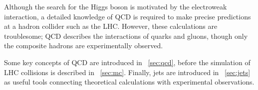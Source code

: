 
Although the search for the Higgs boson is motivated by the electroweak interaction, a
detailed knowledge of \ac{QCD} is required to make precise predictions at a hadron 
collider such as the LHC. However, these calculations are troublesome; \ac{QCD} 
describes the interactions of quarks and gluons, though only the composite hadrons are 
experimentally observed.

Some key concepts of \ac{QCD} are introduced in \Section~\ref{sec:qcd}, before the 
simulation of LHC collisions is described in \Section~\ref{sec:mc}. Finally, jets are 
introduced in \Section~\ref{sec:jets} as useful tools connecting theoretical calculations 
with experimental observations.
